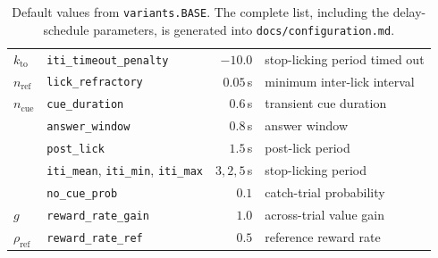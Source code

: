 \documentclass[11pt]{article}
\newcommand{\1}{\mathbf{1}}
\begin{document}
\begin{table}[h]
\begin{tabular}{llrl}
$k_{\mathrm{to}}$ & \texttt{iti\_timeout\_penalty} & $-10.0$ & stop-licking period timed out \\
$n_{\mathrm{ref}}$ & \texttt{lick\_refractory} & $0.05$\,s & minimum inter-lick interval \\
$n_{\mathrm{cue}}$ & \texttt{cue\_duration} & $0.6$\,s & transient cue duration \\
& \texttt{answer\_window} & $0.8$\,s & answer window \\
& \texttt{post\_lick} & $1.5$\,s & post-lick period \\
& \texttt{iti\_mean}, \texttt{iti\_min}, \texttt{iti\_max} & $3, 2, 5$\,s & stop-licking period \\
& \texttt{no\_cue\_prob} & $0.1$ & catch-trial probability \\
$g$ & \texttt{reward\_rate\_gain} & $1.0$ & across-trial value gain \\
$\rho_{\mathrm{ref}}$ & \texttt{reward\_rate\_ref} & $0.5$ & reference reward rate \\
\bottomrule
\end{tabular}
\caption{Default values from \texttt{variants.BASE}. The complete list, including the
delay-schedule parameters, is generated into \texttt{docs/configuration.md}.}
\end{table}
\end{document}
